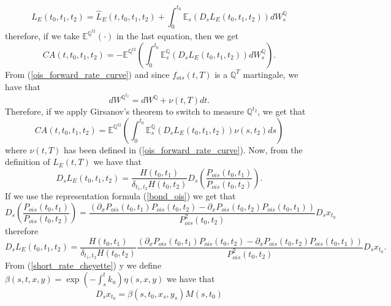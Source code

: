 \documentclass[a4paper,10pt]{article}
\newcommand{\1}{\mathbf{1}}
\begin{document}
\begin{equation}
L_{E}(t_0,t_1,t_2) = \hat{L}_{E}(t,t_0, t_1, t_2) + \int_{0}^{t_0} \mathbb{E}_{s}\left(D_s L_{E}(t_0,t_1,t_2) \right) dW^{\mathbb{Q}}_s
\end{equation} 
therefore, if we take $\mathbb{E}^{\mathbb{Q}^{t2}}(\cdot)$ in the last equation, then we get
\begin{equation*}
CA(t, t_0, t_1, t_2) = - \mathbb{E}^{\mathbb{Q}^{t2}}\left(\int_{0}^{t_0} \mathbb{E}^{\mathbb{Q}}_{s}\left(D_s L_{E}(t_0,t_1,t_2) \right) dW^{\mathbb{Q}}_s \right).
\end{equation*}
From (\ref{ois_forward_rate_curve}) and since $f_{ois}(t,T)$ is a $\mathbb{Q}^{T}$ martingale, we have that
\begin{equation*}
dW^{\mathbb{Q}^{t_2}} = dW^{\mathbb{Q}} + \nu(t,T) dt. 
\end{equation*}
Therefore, if we apply Girsanov's theorem to switch to measure $\mathbb{Q}^{t_2}$, we get that
\begin{equation}\label{ca_general_future}
CA(t, t_0, t_1, t_2) = \mathbb{E}^{\mathbb{Q}^{t2}}\left(\int_{0}^{t_0} \mathbb{E}^{\mathbb{Q}}_{s}\left(D_s L_{E}(t_0,t_1,t_2) \right) \nu(s,t_2) ds \right)
\end{equation}
where $\nu(t,T)$ has been defined in (\ref{ois_forward_rate_curve}). Now, from the definition of $L_{E}(t,T)$ we have that
\begin{equation*}
D_s L_{E}(t_0,t_1,t_2) = \frac{H(t_0,t_1)}{\delta_{t_1,t_2}H(t_0,t_2)} D_s \left(\frac{P_{ois}(t_0,t_1)}{P_{ois}(t_0,t_2)}\right). 
\end{equation*}
If we use the representation formula (\ref{bond_ois}) we get that
\begin{equation*}
D_s \left(\frac{P_{ois}(t_0,t_1)}{P_{ois}(t_0,t_2)}\right) = \frac{\left(\partial_{x}P_{ois}(t_0,t_1)P_{ois}(t_0,t_2) - \partial_{x}P_{ois}(t_0,t_2) P_{ois}(t_0,t_1) \right)}{P^{2}_{ois}(t_0,t_2)} D_s x_{t_0}
\end{equation*}
therefore
\begin{equation}\label{malliavin_derive_L}
D_s L_{E}(t_0,t_1,t_2) = \frac{H(t_0,t_1)}{\delta_{t_1,t_2}H(t_0,t_2)}\frac{\left(\partial_{x}P_{ois}(t_0,t_1)P_{ois}(t_0,t_2) - \partial_{x}P_{ois}(t_0,t_2) P_{ois}(t_0,t_1) \right)}{P^{2}_{ois}(t_0,t_2)} D_s x_{t_0}. 
\end{equation}
From (\ref{short_rate_cheyette}) y we define $\beta(s,t, x, y) = \exp\left(-\int_{s}^{t} k_{u} \right) \eta(s, x, y)$ we have that
\begin{equation}\label{malliavin_derive_x}
D_s x_{t_0} = \beta(s,t_0, x_s, y_s)M(s,t_0)
\end{equation}
\end{document}
